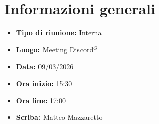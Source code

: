 \section{Informazioni generali}

\begin{itemize}
    \item \textbf{Tipo di riunione:} Interna
    \item \textbf{Luogo:} Meeting Discord$^G$
    \item \textbf{Data:} 09/03/2026
    \item \textbf{Ora inizio:} 15:30
    \item \textbf{Ora fine:} 17:00
    \item \textbf{Scriba:} Matteo Mazzaretto
\end{itemize}